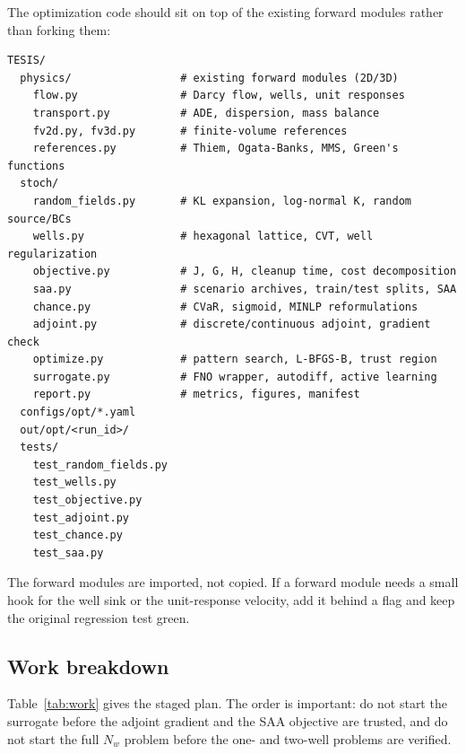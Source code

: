 \documentclass[11pt]{article}
\numberwithin{equation}{section}
\theoremstyle{plain}
\begin{document}
The optimization code should sit on top of the existing forward modules rather
than forking them:
\begin{verbatim}
TESIS/
  physics/                 # existing forward modules (2D/3D)
    flow.py                # Darcy flow, wells, unit responses
    transport.py           # ADE, dispersion, mass balance
    fv2d.py, fv3d.py       # finite-volume references
    references.py          # Thiem, Ogata-Banks, MMS, Green's functions
  stoch/
    random_fields.py       # KL expansion, log-normal K, random source/BCs
    wells.py               # hexagonal lattice, CVT, well regularization
    objective.py           # J, G, H, cleanup time, cost decomposition
    saa.py                 # scenario archives, train/test splits, SAA
    chance.py              # CVaR, sigmoid, MINLP reformulations
    adjoint.py             # discrete/continuous adjoint, gradient check
    optimize.py            # pattern search, L-BFGS-B, trust region
    surrogate.py           # FNO wrapper, autodiff, active learning
    report.py              # metrics, figures, manifest
  configs/opt/*.yaml
  out/opt/<run_id>/
  tests/
    test_random_fields.py
    test_wells.py
    test_objective.py
    test_adjoint.py
    test_chance.py
    test_saa.py
\end{verbatim}
The forward modules are imported, not copied.  If a forward module needs a
small hook for the well sink or the unit-response velocity, add it behind a
flag and keep the original regression test green.

\subsection{Work breakdown}

Table~\ref{tab:work} gives the staged plan.  The order is important: do not
start the surrogate before the adjoint gradient and the SAA objective are
trusted, and do not start the full $N_w$ problem before the one- and two-well
problems are verified.
\end{document}

